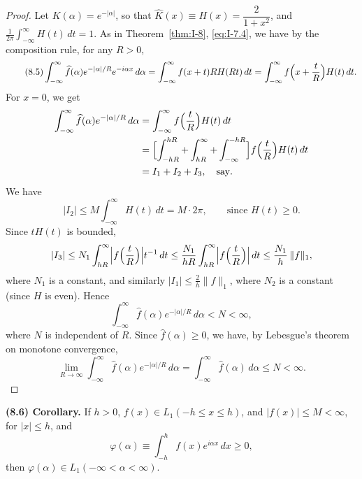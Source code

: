 \begin{proof}
Let $K(\alpha)=e^{-|\alpha|}$, so that $\hat K(x)\equiv H(x)=\dfrac{2}{1+x^{2}}$, and $\frac{1}{2\pi}\int_{-\infty}^{\infty}H(t)\,dt=1$. As in Theorem~\ref{thm:I-8}, \eqref{eq:I-7.4}, we have by the composition rule, for any $R>0$,
\begin{equation}\label{eq:I-8.5}\tag{8.5}
\int_{-\infty}^{\infty}\widehat f(\alpha)e^{-|\alpha|/R}e^{-i\alpha x}\,d\alpha
=\int_{-\infty}^{\infty}f(x+t)RH(Rt)\,dt
=\int_{-\infty}^{\infty}f\Bigl(x+\frac{t}{R}\Bigr)H(t)\,dt.
\end{equation}
For $x=0$, we get
\begin{equation*}
\begin{aligned}
\int_{-\infty}^{\infty}\widehat f(\alpha)e^{-|\alpha|/R}\,d\alpha &= \int_{-\infty}^{\infty}f\Bigl(\frac{t}{R}\Bigr)H(t)\,dt\\
&= \Bigl[\int_{-hR}^{hR}+\int_{hR}^{\infty}+\int_{-\infty}^{-hR}\Bigr]f\Bigl(\frac{t}{R}\Bigr)H(t)\,dt\\
&= I_1+I_2+I_3,\quad\text{say}.
\end{aligned}
\end{equation*}
We have
\begin{equation*}
|I_2|\le M\int_{-\infty}^{\infty}H(t)\,dt=M\cdot 2\pi,\qquad\text{since }H(t)\ge 0.
\end{equation*}
Since $tH(t)$ is bounded,
\begin{equation*}
|I_3|\le N_1\int_{hR}^{\infty}\Bigl|f\Bigl(\frac{t}{R}\Bigr)\Bigr|t^{-1}\,dt
\le\frac{N_1}{hR}\int_{hR}^{\infty}\Bigl|f\Bigl(\frac{t}{R}\Bigr)\Bigr|\,dt
\le\frac{N_1}{h}\,\|f\|_1,
\end{equation*}
where $N_1$ is a constant, and similarly $|I_1|\le\frac{2}{h}\|f\|_1$, where $N_2$ is a constant (since $H$ is even). Hence
\begin{equation*}
\int_{-\infty}^{\infty}\widehat f(\alpha)e^{-|\alpha|/R}\,d\alpha<N<\infty,
\end{equation*}
where $N$ is independent of $R$. Since $\widehat f(\alpha)\ge 0$, we have, by Lebesgue's theorem on monotone convergence,
\begin{equation*}
\lim_{R\to\infty}\int_{-\infty}^{\infty}\widehat f(\alpha)e^{-|\alpha|/R}\,d\alpha
=\int_{-\infty}^{\infty}\widehat f(\alpha)\,d\alpha\le N<\infty.
\end{equation*}
\end{proof}

\noindent\textbf{(8.6) Corollary.}
If $h>0$, $f(x)\in L_1(-h\le x\le h)$, and $|f(x)|\le M<\infty$, for $|x|\le h$, and
\begin{equation*}
\varphi(\alpha)\equiv\int_{-h}^{h}f(x)e^{i\alpha x}\,dx\ge 0,
\end{equation*}
then $\varphi(\alpha)\in L_1(-\infty<\alpha<\infty)$.

